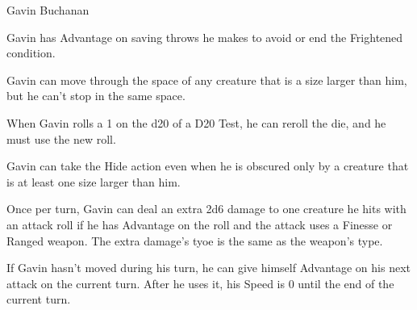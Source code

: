 \begin{DndMonster}[width=0.5\textwidth]{Gavin Buchanan}
	
	\DndMonsterBasics[
		armor-class = {15 (Leather Armor)},
		initiative	= +4,
		hit-points  = {\DndDice{2d10 + 4}},
		speed       = {30 ft.},
	]
	
	\renewcommand{\AbilityScoreSpacer}{~}
	\DndMonsterAbilityScores[
		str = 9,
		dex = 18,
		con = 14,
		int = 15,
		wis = 13,
		cha = 12,
	]
	
	\DndMonsterDetails[
		saving-throws			= {DEX +6, INT +4},
		skills					= {Acrobatics +6, Perception +5, Stealth +8},
		senses					= {Passive Perception 15},
		languages				= {Common, Thieves' Cant},
	]
    
	Gavin has Advantage on saving throws he makes to avoid or end the Frightened condition.
	
	Gavin can move through the space of any creature that is a size larger than him, but he can't stop in the same space.
	
	When Gavin rolls a 1 on the d20 of a D20 Test, he can reroll the die, and he must use the new roll.
	
	Gavin can take the Hide action even when he is obscured only by a creature that is at least one size larger than him.
	
	Once per turn, Gavin can deal an extra 2d6 damage to one creature he hits with an attack roll if he has Advantage on the roll and the attack uses a Finesse or Ranged weapon. The extra damage's tyoe is the same as the weapon's type.
	
	If Gavin hasn't moved during his turn, he can give himself Advantage on his next attack on the current turn. After he uses it, his Speed is 0 until the end of the current turn.
	
	\DndMonsterAttack[
		name			= Dagger,
		distance		= melee,	%
		mod				= +6,
		reach			= 5,
		targets			= one target,
		dmg				= \DndDice{1d4 + 4},
		dmg-type		= Piercing,
	]
	

\end{DndMonster}
